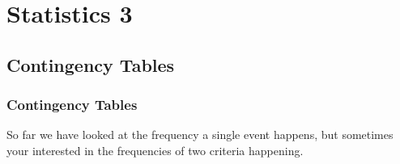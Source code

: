 \chapter{Statistics 3}

\newpage
\section{Contingency Tables}

    \newpage
    \subsection{Contingency Tables}
        So far we have looked at the frequency a single event happens, but sometimes your interested in the frequencies of two criteria happening.
        
